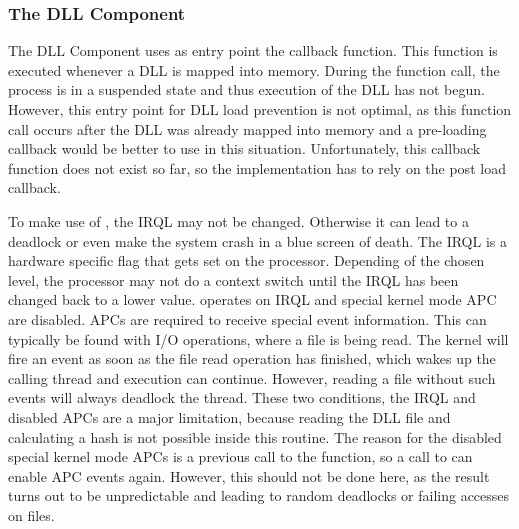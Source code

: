 \subsubsection{The DLL Component}
The \gls{DLL} Component uses as entry point the  callback function. This function is executed whenever a \gls{DLL} is mapped into memory. During the function call, the process is in a suspended state and thus execution of the \gls{DLL} has not begun. However, this entry point for \gls{DLL} load prevention is not optimal, as this function call occurs after the \gls{DLL} was already mapped into memory and a pre-loading callback would be better to use in this situation. Unfortunately, this callback function does not exist so far, so the implementation has to rely on the post load callback.

\medskip

To make use of , the \gls{IRQL} may not be changed. Otherwise it can lead to a deadlock or even make the system crash in a blue screen of death. The \gls{IRQL} is a hardware specific flag that gets set on the processor. Depending of the chosen level, the processor may not do a context switch until the \gls{IRQL} has been changed back to a lower value.  operates on \gls{IRQL}  and special kernel mode \gls{APC} are disabled. \glspl{APC} are required to receive special event information. This can typically be found with I/O operations, where a file is being read. The kernel will fire an event as soon as the file read operation has finished, which wakes up the calling thread and execution can continue. However, reading a file without such events will always deadlock the thread. These two conditions, the \gls{IRQL} and disabled \glspl{APC} are a major limitation, because reading the \gls{DLL} file and calculating a hash is not possible inside this routine. The reason for the disabled special kernel mode \glspl{APC} is a previous call to the  function, so a call to  can enable \gls{APC} events again. However, this should not be done here, as the result turns out to be unpredictable and leading to random deadlocks or failing accesses on files.

\medskip

